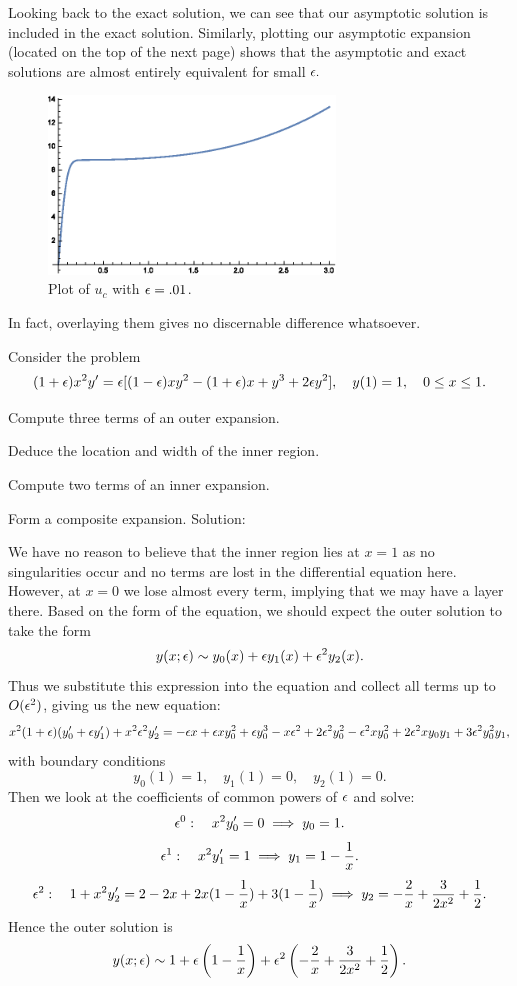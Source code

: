 Looking back to the exact solution, we can see that our asymptotic solution is included in the exact solution. Similarly, plotting our asymptotic expansion (located on the top of the next page) shows that the asymptotic and exact solutions are almost entirely equivalent for small $\epsilon.$
\begin{figure}[h]
\centering\includegraphics[width=3in]{test1no2prt2}
\caption{Plot of $u_c$ with $\epsilon=.01$.}
\end{figure}
In fact, overlaying them gives no discernable difference whatsoever.
\pagebreak
\item Consider the problem
$$(1+\epsilon)x^2y'=\epsilon[(1-\epsilon)xy^2-(1+\epsilon)x+y^3+2\epsilon y^2],\quad y(1)=1,\quad 0\leq x\leq 1.$$
\benum
\item Compute three terms of an outer expansion.
\item Deduce the location and width of the inner region.
\item Compute two terms of an inner expansion.
\item Form a composite expansion.
\eenum
Solution:\\

\benum
\item We have no reason to believe that the inner region lies at $x=1$ as no singularities occur and no terms are lost in the differential equation here. However, at $x=0$ we lose almost every term, implying that we may have a layer there. Based on the form of the equation, we should expect the outer solution to take the form
$$y(x;\epsilon)\sim y_0(x)+\epsilon y_1(x)+\epsilon^2 y_2(x).$$
Thus we substitute this expression into the equation and collect all terms up to $O(\epsilon^2)$, giving us the new equation:
$$x^2(1+\epsilon)(y_0'+\epsilon y_1')+x^2\epsilon^2 y_2'=-\epsilon x+\epsilon xy_0^2+\epsilon y_0^3-x\epsilon^2+2\epsilon^2y_0^2-\epsilon^2 xy_0^2+2\epsilon^2 x y_0y_1+3\epsilon^2y_0^2y_1,$$
with boundary conditions
$$y_0(1)=1,\quad y_1(1)=0,\quad y_2(1)=0.$$
Then we look at the coefficients of common powers of $\epsilon$ and solve:
$$\epsilon^0:\quad x^2 y_0'=0\implies y_0=1.$$
$$\epsilon^1:\quad x^2y_1'=1\implies y_1=1-\frac{1}{x}.$$
$$\epsilon^2:\quad 1+x^2 y_2'=2-2x+2x(1-\frac{1}{x})+3(1-\frac{1}{x})\implies y_2=-\frac{2}{x}+\frac{3}{2x^2}+\frac{1}{2}.$$
Hence the outer solution is
$$y(x;\epsilon)\sim 1+\epsilon\left(1-\frac{1}{x}\right)+\epsilon^2\left(-\frac{2}{x}+\frac{3}{2x^2}+\frac{1}{2}\right).$$


